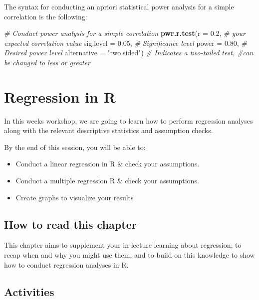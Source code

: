 \documentclass[
]{book}
\newenvironment{Shaded}{\begin{snugshade}}{\end{snugshade}}
\newcommand{\AttributeTok}[1]{\textcolor[rgb]{0.13,0.29,0.53}{#1}}
\newcommand{\CommentTok}[1]{\textcolor[rgb]{0.56,0.35,0.01}{\textit{#1}}}
\newcommand{\FloatTok}[1]{\textcolor[rgb]{0.00,0.00,0.81}{#1}}
\newcommand{\FunctionTok}[1]{\textcolor[rgb]{0.13,0.29,0.53}{\textbf{#1}}}
\newcommand{\NormalTok}[1]{#1}
\newcommand{\StringTok}[1]{\textcolor[rgb]{0.31,0.60,0.02}{#1}}
\begin{document}
The syntax for conducting an apriori statistical power analysis for a simple correlation is the following:

\begin{Shaded}
\begin{Highlighting}[]
\CommentTok{\# Conduct power analysis for a simple correlation}
\FunctionTok{pwr.r.test}\NormalTok{(}\AttributeTok{r =} \FloatTok{0.2}\NormalTok{, }\CommentTok{\# your expected correlation value}
           \AttributeTok{sig.level =} \FloatTok{0.05}\NormalTok{, }\CommentTok{\# Significance level}
           \AttributeTok{power =} \FloatTok{0.80}\NormalTok{, }\CommentTok{\# Desired power level}
\AttributeTok{alternative =} \StringTok{"two.sided"}\NormalTok{) }\CommentTok{\# Indicates a two{-}tailed test, \#can be changed to less or greater}
\end{Highlighting}
\end{Shaded}

\chapter{\texorpdfstring{\textbf{Regression in R}}{Regression in R}}\label{regression-in-r}

In this weeks workshop, we are going to learn how to perform regression analyses along with the relevant descriptive statistics and assumption checks.

By the end of this session, you will be able to:

\begin{itemize}
\item
  Conduct a linear regression in R \& check your assumptions.
\item
  Conduct a multiple regression R \& check your assumptions.
\item
  Create graphs to visualize your results
\end{itemize}

\section{How to read this chapter}\label{how-to-read-this-chapter-4}

This chapter aims to supplement your in-lecture learning about regression, to recap when and why you might use them, and to build on this knowledge to show how to conduct regression analyses in R.

\section{Activities}\label{activities-4}
\end{document}
